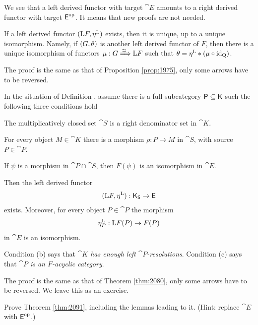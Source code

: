 We see that a left derived functor with target $\cat{E}$ amounts to a right 
derived functor with target $\operatorname{\mathsf{E}}^{\mathrm{op}}$. It means that new proofs are 
not needed. 

\begin{prop} \label{prop:2090}
If a left derived functor $(\mathrm{L} F, \eta^{\mathrm{L}})$ exists, then it is
unique, up to a unique isomorphism. Namely, if  $(G, \theta)$ is another left 
derived functor of $F$, then there is a unique isomorphism of functors 
$\mu : G \stackrel{\simeq\ }{\Longrightarrow} \mathrm{L} F$ such that 
$\theta = \eta^{\mathrm{L}} * (\mu \circ \operatorname{id}_{\operatorname{Q}})$.
\end{prop}

The proof is the same as that of Proposition \ref{prop:1975}, only some arrows 
have to be reversed. 

\begin{thm} \label{thm:2091}
In the situation of Definition \tup{\ref{dfn:2090}}, 
assume there is a full subcategory $\operatorname{\mathsf{P}} \subseteq \operatorname{\mathsf{K}}$
such the following three conditions hold\tup{:}
\begin{enumerate}
 The multiplicatively closed set $\cat{S}$ 
is a right denominator set in $\cat{K}$. 

 For every object $M \in \cat{K}$ there is a morphism 
$\rho : P \to M$ in $\cat{S}$, with source $P \in \cat{P}$. 

 If $\psi$ is a morphism in $\cat{P} \cap \cat{S}$, then 
$F(\psi)$ is an isomorphism in $\cat{E}$.
\end{enumerate}
Then the left derived functor
\[ (\mathrm{L} F, \eta^{\mathrm{L}}) : \operatorname{\mathsf{K}}_{\operatorname{\mathsf{S}}} \to \operatorname{\mathsf{E}} \]
exists. Moreover, for every object $P \in \cat{P}$ the morphism  
\[ \eta^{\mathrm{L}}_{P} : \mathrm{L} F(P) \to F(P) \]
in $\cat{E}$ is an isomorphism.
\end{thm}

Condition (b) says that {\em $\cat{K}$ has enough left $\cat{P}$-resolutions}. 
Condition (c) says that {\em $\cat{P}$ is an $F$-acyclic category}. 

The proof is the same as that of Theorem \ref{thm:2080}, only some arrows 
have to be reversed. We leave this as an exercise. 

\begin{exer} \label{exer:2330}
Prove Theorem \ref{thm:2091}, including the lemmas leading to it. 
(Hint: replace $\cat{E}$ with $\operatorname{\mathsf{E}}^{\mathrm{op}}$.)
\end{exer}


